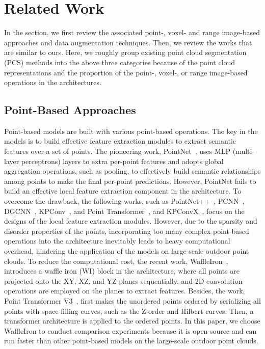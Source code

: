\section{Related Work}
\label{sec:related_works}
In the section, we first review the associated point-, voxel- and range image-based approaches and data augmentation techniques. Then, we review the works that are similar to ours. Here, we roughly group existing point cloud segmentation (PCS) methods into the above three categories because of the point cloud representations and the proportion of the point-, voxel-, or range image-based operations in the architectures. %


\subsection{Point-Based Approaches}
Point-based models are built with various point-based operations. The key in the models is to build effective feature extraction modules to extract semantic features over a set of points. The pioneering work, PointNet~\cite{pointnet++_2017}, uses MLP (multi-layer perceptrons) layers to extra per-point features and adopts global aggregation operations, such as pooling, to effectively build semantic relationships among points to make the final per-point predictions. However, PointNet fails to build an effective local feature extraction component in the architecture. To overcome the drawback, the following works, such as PointNet++~\cite{pointnet++_2017}, PCNN~\cite{pcnn2018}, DGCNN~\cite{dgcnn2019}, KPConv~\cite{kpconv_2019}, and Point Transformer~\cite{pointtrans2021}, and KPConvX~\cite{kpconvx24}, focus on the designs of the local feature extraction modules. However, due to the sparsity and disorder properties of the points, incorporating too many complex point-based operations into the architecture inevitably leads to heavy computational overhead, hindering the application of the models on large-scale outdoor point clouds. To reduce the computational cost, the recent work, WaffleIron~\cite{waffleiron23}, introduces a waffle iron (WI) block in the architecture, where all points are projected onto the XY, XZ, and YZ planes sequentially, and 2D convolution operations are employed on the planes to extract features. Besides, the work, Point Transformer V3~\cite{pointtransv32024}, first makes the unordered points ordered by serializing all points with space-filling curves, such as the Z-order and Hilbert curves. Then, a transformer architecture is applied to the ordered points. In this paper, we choose WaffleIron to conduct comparison experiments because it is open-source and can run faster than other point-based models on the large-scale outdoor point clouds.



